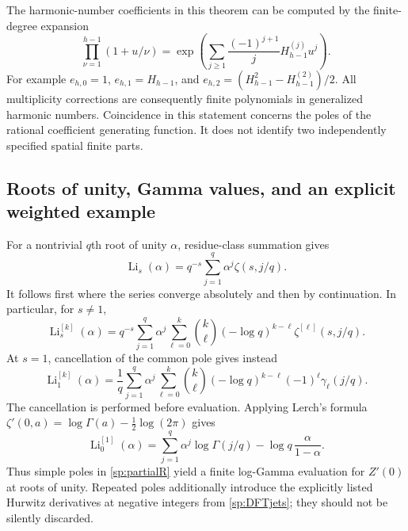 The harmonic-number coefficients in this theorem can be computed by
the finite-degree expansion
\begin{equation}\label{sp:harmonicexp}
 \prod_{\nu=1}^{h-1}(1+u/\nu)
 =\exp\!\left(
    \sum_{j\geq1}\frac{(-1)^{j+1}}j H_{h-1}^{(j)}u^j\right).
\end{equation}
For example $e_{h,0}=1$, $e_{h,1}=H_{h-1}$, and
$e_{h,2}=(H_{h-1}^2-H_{h-1}^{(2)})/2$.
All multiplicity corrections are consequently finite polynomials in
generalized harmonic numbers.  Coincidence in this statement concerns
the poles of the rational coefficient generating function.  It does
not identify two independently specified spatial finite parts.

\subsection{Roots of unity, Gamma values, and an explicit weighted example}

For a nontrivial $q$th root of unity $\alpha$, residue-class summation
gives
\begin{equation}\label{sp:DFT}
 \operatorname{Li}_s(\alpha)
   =q^{-s}\sum_{j=1}^q\alpha^j\zeta(s,j/q).
\end{equation}
It follows first where the series converge absolutely and then by
continuation.  In particular, for $s\ne1$,
\begin{equation}\label{sp:DFTjets}
 \operatorname{Li}_s^{[k]}(\alpha)
 =q^{-s}\sum_{j=1}^q\alpha^j
       \sum_{\ell=0}^k\binom{k}{\ell}(-\log q)^{k-\ell}
                 \zeta^{[\ell]}(s,j/q).
\end{equation}
At $s=1$, cancellation of the common pole gives instead
\begin{equation}\label{sp:DFTstieltjes}
 \operatorname{Li}_1^{[k]}(\alpha)
 =\frac1q\sum_{j=1}^q\alpha^j
       \sum_{\ell=0}^k\binom{k}{\ell}
        (-\log q)^{k-\ell}(-1)^\ell\gamma_\ell(j/q).
\end{equation}
The cancellation is performed before evaluation.  Applying Lerch's
formula $\zeta'(0,a)=\log\Gamma(a)-\tfrac12\log(2\pi)$
\cite[Eq.~25.11.18]{DLMFHzeta} gives
\begin{equation}\label{sp:Gammajet}
 \operatorname{Li}_0^{[1]}(\alpha)
   =\sum_{j=1}^q\alpha^j\log\Gamma(j/q)
       -\log q\,\frac{\alpha}{1-\alpha}.
\end{equation}
Thus simple poles in \eqref{sp:partialR} yield a finite log-Gamma
evaluation for $Z'(0)$ at roots of unity.  Repeated poles additionally
introduce the explicitly listed Hurwitz derivatives at negative
integers from \eqref{sp:DFTjets}; they should not be silently discarded.

